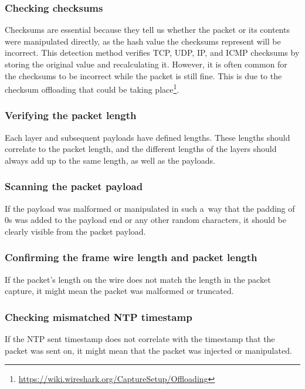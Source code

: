 \documentclass[
  printed,     %
  color,       %
  oneside,     %
  nosansbold,  %
  nocolorbold, %
  nolof,         %
  nolot,         %
]{fithesis4}
\begin{document}
\subsubsection{Checking checksums}

Checksums are essential because they tell us whether the packet or its contents were manipulated directly, as the hash value the checksums represent will be incorrect. This detection method verifies TCP, UDP, IP, and ICMP checksums by storing the original value and recalculating it. However, it is often common for the checksums to be incorrect while the packet is still fine. This is due to the checksum offloading that could be taking place\footnote{\url{https://wiki.wireshark.org/CaptureSetup/Offloading}}.

\subsubsection{Verifying the packet length}

Each layer and subsequent payloads have defined lengths. These lengths should correlate to the packet length, and the different lengths of the layers should always add up to the same length, as well as the payloads.

\subsubsection{Scanning the packet payload}

If the payload was malformed or manipulated in such a~way that the padding of 0s was added to the payload end or any other random characters, it should be clearly visible from the packet payload.

\subsubsection{Confirming the frame wire length and packet length}

If the packet's length on the wire does not match the length in the packet capture, it might mean the packet was malformed or truncated.

\subsubsection{Checking mismatched NTP timestamp}

If the NTP sent timestamp does not correlate with the timestamp that the packet was sent on, it might mean that the packet was injected or manipulated.
\end{document}
